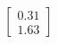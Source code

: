 \documentclass[preview]{standalone}
\begin{document}
\begin{align*}
\begin{bmatrix} 0.31 \\ 1.63 \end{bmatrix}
\end{align*}
\end{document}
